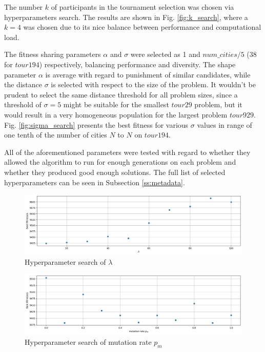 \documentclass[a4paper,10pt]{article}
\begin{document}
The number $k$ of participants in the tournament selection was chosen via hyperparameters search. The results are shown in Fig. \ref{fig:k_search}, where a $k=4$ was chosen due to its nice balance between performance and computational load.

The fitness sharing parameters $\alpha$ and $\sigma$ were selected as 1 and $num\_cities / 5$ ($38$ for $tour194$) respectively, balancing performance and diversity. The shape parameter $\alpha$ is average with regard to punishment of similar candidates, while the distance $\sigma$ is selected with respect to the size of the problem. It wouldn't be prudent to select the same distance threshold for all problem sizes, since a threshold of $\sigma=5$ might be suitable for the smallest $tour29$ problem, but it would result in a very homogeneous population for the largest problem $tour929$. Fig. \ref{fig:sigma_search} presents the best fitness for various $\sigma$ values in range of one tenth of the number of cities $N$ to $N$ on $tour194$.

All of the aforementioned parameters were tested with regard to whether they allowed the algorithm to run for enough generations on each problem and whether they produced good enough solutions. The full list of selected hyperparameters can be seen in Subsection \ref{ss:metadata}.

\begin{figure}[H]
\centering
\includegraphics[width=\textwidth]{results/tuning/lambda_hyperparameter_search.png}
\caption{Hyperparameter search of $\lambda$}\label{fig:lambda_search}
\end{figure}%

\begin{figure}[H]
\includegraphics[width=\textwidth]{results/tuning/mutation_rate_hyperparameter_search.png}
\caption{Hyperparameter search of mutation rate $p_m$}
\label{fig:pm_search}
\end{figure}%
\end{document}
